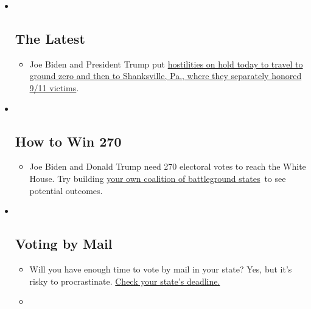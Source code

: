 \begin{itemize}
\item ~
  \hypertarget{the-latest}{%
  \subsection{The Latest}\label{the-latest}}

  \begin{itemize}
  \item
    Joe Biden and President Trump put
    \href{https://www.nytimes3xbfgragh.onion/2020/09/11/us/politics/shanksville-trump-biden.html?action=click\&pgtype=Article\&state=default\&region=BELOW_MAIN_CONTENT\&context=storylines_guide}{hostilities
    on hold today to travel to ground zero and then to Shanksville, Pa.,
    where they separately honored 9/11 victims}.
  \end{itemize}
\item ~
  \hypertarget{how-to-win-270}{%
  \subsection{How to Win 270}\label{how-to-win-270}}

  \begin{itemize}
  \item
    Joe Biden and Donald Trump need 270 electoral votes to reach the
    White House. Try building
    \href{https://www.nytimes3xbfgragh.onion/interactive/2020/us/elections/election-states-biden-trump.html?action=click\&pgtype=Article\&state=default\&region=BELOW_MAIN_CONTENT\&context=storylines_guide}{your
    own coalition of battleground states}~to see potential outcomes.
  \end{itemize}
\item ~
  \hypertarget{voting-by-mail}{%
  \subsection{Voting by Mail}\label{voting-by-mail}}

  \begin{itemize}
  \item
    Will you have enough time to vote by mail in your state? Yes, but
    it's risky to procrastinate.
    \href{https://www.nytimes3xbfgragh.onion/interactive/2020/08/31/us/politics/vote-by-mail-deadlines.html?action=click\&pgtype=Article\&state=default\&region=BELOW_MAIN_CONTENT\&context=storylines_guide}{Check
    your state's deadline.}
  \item
    \href{https://www.nytimes3xbfgragh.onion/interactive/2020/us/elections/joe-biden.html?action=click\&pgtype=Article\&state=default\&region=BELOW_MAIN_CONTENT\&context=storylines_guide}{}


\end{itemize}
\end{itemize}

